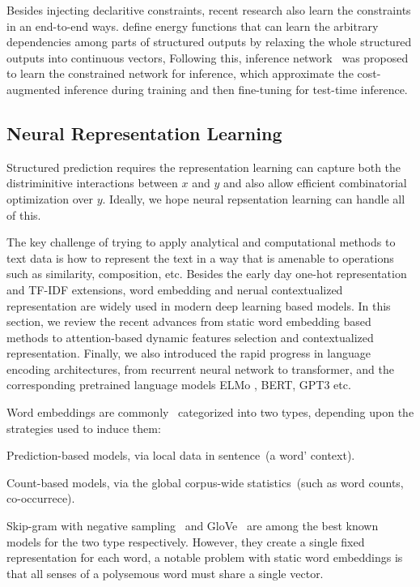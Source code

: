 Besides injecting declaritive constraints, recent research also learn
the constraints in an end-to-end
ways. \citet[SPEN,][]{belanger2016structured} define energy functions
that can learn the arbitrary dependencies among parts of structured
outputs by relaxing the whole structured outputs into continuous
vectors, Following this, inference network~\cite{tu2018learning} was
proposed to learn the constrained network for inference, which
approximate the cost-augmented inference during training and then
fine-tuning for test-time inference.

\subsection{Neural Representation Learning}
\label{ssec:bg:rep-learning}
Structured prediction requires the representation learning can capture
both the distriminitive interactions between $x$ and $y$ and also
allow efficient combinatorial optimization over $y$. Ideally, we hope
neural repsentation learning can handle all of this.

The key challenge of trying to apply analytical and computational
methods to text data is how to represent the text in a way that is
amenable to operations such as similarity, composition, etc. Besides
the early day one-hot representation and TF-IDF extensions, word
embedding and nerual contextualized representation are widely used in
modern deep learning based models. In this section, we review the
recent advances from static word embedding based methods to
attention-based dynamic features selection and contextualized
representation. Finally, we also introduced the rapid progress in
language encoding architectures, from recurrent neural network to
transformer, and the corresponding pretrained language models ELMo ,
BERT, GPT3 etc.

Word embeddings are
commonly~\cite{Baroni:2014,pennington2014glove,li2015generative}
categorized into two types, depending upon the strategies used to
induce them:
\begin{inparaenum}[(1)]
\item Prediction-based models, via local data in sentence~(a word'
  context).
\item Count-based models, via the global corpus-wide statistics~(such
  as word counts, co-occurrece).
\end{inparaenum}
Skip-gram with negative sampling~\cite[SGNS,][]{mikolov13w2v} and
GloVe~\cite{pennington2014glove} are among the best known models for
the two type respectively. However, they create a single fixed
representation for each word, a notable problem with static word
embeddings is that all senses of a polysemous word must share a single
vector.

